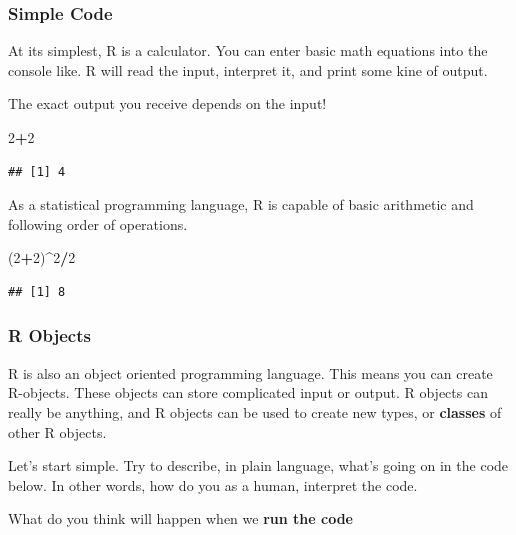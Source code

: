 \documentclass[
]{book}
\newenvironment{Shaded}{\begin{snugshade}}{\end{snugshade}}
\newcommand{\DecValTok}[1]{\textcolor[rgb]{0.00,0.00,0.81}{#1}}
\newcommand{\NormalTok}[1]{#1}
\newcommand{\SpecialCharTok}[1]{\textcolor[rgb]{0.81,0.36,0.00}{\textbf{#1}}}
\begin{document}
\hypertarget{simple-code}{%
\subsubsection{Simple Code}\label{simple-code}}

At its simplest, R is a calculator. You can enter basic math equations into the console like. R will read the input, interpret it, and print some kine of output.

The exact output you receive depends on the input!

\begin{Shaded}
\begin{Highlighting}[]
\DecValTok{2}\SpecialCharTok{+}\DecValTok{2}
\end{Highlighting}
\end{Shaded}

\begin{verbatim}
## [1] 4
\end{verbatim}

As a statistical programming language, R is capable of basic arithmetic and following order of operations.

\begin{Shaded}
\begin{Highlighting}[]
\NormalTok{(}\DecValTok{2}\SpecialCharTok{+}\DecValTok{2}\NormalTok{)}\SpecialCharTok{\^{}}\DecValTok{2}\SpecialCharTok{/}\DecValTok{2}
\end{Highlighting}
\end{Shaded}

\begin{verbatim}
## [1] 8
\end{verbatim}

\hypertarget{r-objects}{%
\subsubsection{R Objects}\label{r-objects}}

R is also an object oriented programming language. This means you can create R-objects. These objects can store complicated input or output. R objects can really be anything, and R objects can be used to create new types, or \textbf{classes} of other R objects.

Let's start simple. Try to describe, in plain language, what's going on in the code below. In other words, how do you as a human, interpret the code.

What do you think will happen when we \textbf{run the code}
\end{document}
